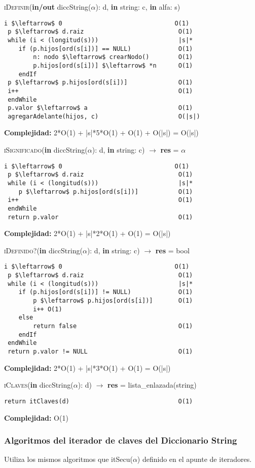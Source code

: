 \textsc{iDefinir}(\textbf{in/out} diccString($\alpha$): d, \textbf{in} string: c, \textbf{in} alfa: s)
\begin{lstlisting}[mathescape]
 i $\leftarrow$ 0 								O(1)
 p $\leftarrow$ d.raiz 							O(1)
 while (i < (longitud(s))) 						|s|*
 	if (p.hijos[ord(s[i])] == NULL) 			O(1)
		n: nodo $\leftarrow$ crearNodo() 		O(1)
		p.hijos[ord(s[i])] $\leftarrow$ *n 		O(1)
	endIf
 p $\leftarrow$ p.hijos[ord(s[i])] 				O(1)
 i++ 											O(1)
 endWhile
 p.valor $\leftarrow$ a 						O(1)
 agregarAdelante(hijos, c) 						O(|s|)
\end{lstlisting}
\textbf{Complejidad:} 2*O(1) + |s|*5*O(1) + O(1) + O(|s|) = O(|s|)

\textsc{iSignificado}(\textbf{in} diccString($\alpha$): d, \textbf{in} string: c) $\rightarrow$ \textbf{res} = $\alpha$
\begin{lstlisting}[mathescape]
 i $\leftarrow$ 0 								O(1)
 p $\leftarrow$ d.raiz 							O(1)
 while (i < (longitud(s))) 						|s|*
	p $\leftarrow$ p.hijos[ord(s[i])] 			O(1)
 i++ 											O(1)
 endWhile
 return p.valor 								O(1)
\end{lstlisting}
\textbf{Complejidad:} 2*O(1) + |s|*2*O(1) + O(1) = O(|s|)

\textsc{iDefinido?}(\textbf{in} diccString($\alpha$): d, \textbf{in} string: c) $\rightarrow$ \textbf{res} = bool
\begin{lstlisting}[mathescape]
 i $\leftarrow$ 0 								O(1)
 p $\leftarrow$ d.raiz 							O(1)
 while (i < (longitud(s))) 						|s|*
 	if (p.hijos[ord(s[i])] != NULL) 			O(1)
		p $\leftarrow$ p.hijos[ord(s[i])] 		O(1)
		i++ O(1)
	else
		return false 							O(1)
	endIf
 endWhile
 return p.valor != NULL 						O(1)
\end{lstlisting}
\textbf{Complejidad:} 2*O(1) + |s|*3*O(1) + O(1) = O(|s|)

\textsc{iClaves}(\textbf{in} diccString($\alpha$): d) $\rightarrow$ \textbf{res} = lista\_enlazada(string)
\begin{lstlisting}[mathescape]
return itClaves(d)								O(1)
\end{lstlisting}
\textbf{Complejidad:} O(1)

\subsubsection{Algoritmos del iterador de claves del Diccionario String}

Utiliza los mismos algoritmos que itSecu($\alpha$) definido en el apunte de iteradores.


